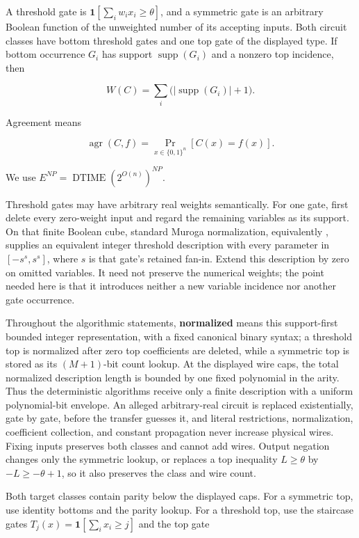 \documentclass[11pt,letterpaper]{article}
\theoremstyle{definition}
\theoremstyle{remark}
\begin{document}
A threshold gate is \(\mathbf1[\sum_iw_ix_i\ge\theta]\), and a symmetric
gate is an arbitrary Boolean function of the unweighted number of its
accepting inputs. Both circuit classes have bottom threshold gates and
one top gate of the displayed type. If bottom occurrence \(G_i\) has
support \(\operatorname{supp}(G_i)\) and a nonzero top incidence, then

\[
W(C)
{}={}
\sum_i
\bigl(
|\operatorname{supp}(G_i)|+1
\bigr).
\]

Agreement means

\[
\operatorname{agr}(C,f)
{}={}
\Pr_{x\in\{0,1\}^n}[C(x)=f(x)].
\]

We use \(E^{NP}=\operatorname{DTIME}(2^{O(n)})^{NP}\).

Threshold gates may have arbitrary real weights semantically. For one
gate, first delete every zero-weight input and regard the remaining
variables as its support. On that finite Boolean cube, standard Muroga
normalization, equivalently \cite[Lemma 3.2]{CTW26}, supplies an
equivalent integer threshold description with every parameter in
\([-s^s,s^s]\), where \(s\) is that gate's retained
fan-in. Extend this description by zero on omitted variables. It need
not preserve the numerical weights; the point needed here is that it
introduces neither a new variable incidence nor another gate occurrence.

Throughout the algorithmic statements, \textbf{normalized} means this
support-first bounded integer representation, with a fixed canonical
binary syntax; a threshold top is normalized after zero top coefficients
are deleted, while a symmetric top is stored as its \((M+1)\)-bit count
lookup. At the displayed wire caps, the total normalized description
length is bounded by one fixed polynomial in the arity. Thus the
deterministic algorithms receive only a finite description with a
uniform polynomial-bit envelope. An alleged arbitrary-real circuit is
replaced existentially, gate by gate, before the transfer guesses it,
and literal restrictions, normalization, coefficient collection, and
constant propagation never increase physical wires. Fixing inputs
preserves both classes and cannot add wires. Output negation changes
only the symmetric lookup, or replaces a top inequality \(L\ge\theta\)
by \(-L\ge-\theta+1\), so it also preserves the class and wire count.

Both target classes contain parity below the displayed caps. For a
symmetric top, use identity bottoms and the parity lookup. For a
threshold top, use the staircase gates
\(T_j(x)=\mathbf1[\sum_ix_i\ge j]\) and the top gate
\end{document}
